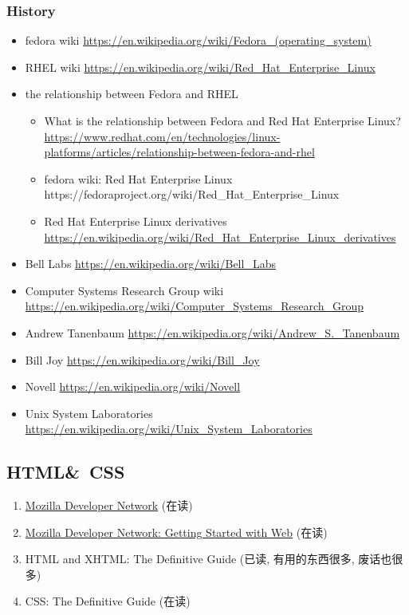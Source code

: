 \documentclass{article}
\begin{document}
\subsubsection{History}
%
\begin{itemize}
    \item fedora wiki \url{https://en.wikipedia.org/wiki/Fedora_(operating_system)}
    \item RHEL wiki \url{https://en.wikipedia.org/wiki/Red_Hat_Enterprise_Linux}
    \item the relationship between Fedora and RHEL
        \begin{itemize}
            \item What is the relationship between Fedora and Red Hat Enterprise Linux? \url{https://www.redhat.com/en/technologies/linux-platforms/articles/relationship-between-fedora-and-rhel}
            \item fedora wiki: Red Hat Enterprise Linux {https://fedoraproject.org/wiki/Red_Hat_Enterprise_Linux}
            \item Red Hat Enterprise Linux derivatives \url{https://en.wikipedia.org/wiki/Red_Hat_Enterprise_Linux_derivatives}
        \end{itemize}
    \item Bell Labs \url{https://en.wikipedia.org/wiki/Bell_Labs}
    \item Computer Systems Research Group wiki \url{https://en.wikipedia.org/wiki/Computer_Systems_Research_Group}
    \item Andrew Tanenbaum \url{https://en.wikipedia.org/wiki/Andrew_S._Tanenbaum}
    \item Bill Joy \url{https://en.wikipedia.org/wiki/Bill_Joy}
    \item Novell \url{https://en.wikipedia.org/wiki/Novell}
    \item Unix System Laboratories \url{https://en.wikipedia.org/wiki/Unix_System_Laboratories}
\end{itemize}
\subsection{HTML\&\ CSS}
\begin{enumerate}
    \item \href{https://developer.mozilla.org/en-US/Learn}{Mozilla Developer Network} (在读)
    \item \href{https://developer.mozilla.org/en-US/Learn/Getting_started_with_the_web}{Mozilla Developer Network: Getting Started with Web} (在读)
    \item HTML and XHTML: The Definitive Guide (已读, 有用的东西很多, 废话也很多)
    \item CSS: The Definitive Guide (在读)
\end{enumerate}
%
\end{document}
